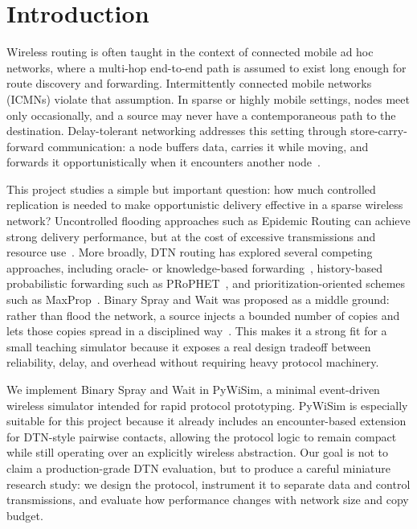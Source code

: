 \section{Introduction}

Wireless routing is often taught in the context of connected mobile ad hoc networks, where a multi-hop end-to-end path is assumed to exist long enough for route discovery and forwarding. Intermittently connected mobile networks (ICMNs) violate that assumption. In sparse or highly mobile settings, nodes meet only occasionally, and a source may never have a contemporaneous path to the destination. Delay-tolerant networking addresses this setting through store-carry-forward communication: a node buffers data, carries it while moving, and forwards it opportunistically when it encounters another node~\cite{fall2003dtn}.

This project studies a simple but important question: how much controlled replication is needed to make opportunistic delivery effective in a sparse wireless network? Uncontrolled flooding approaches such as Epidemic Routing can achieve strong delivery performance, but at the cost of excessive transmissions and resource use~\cite{vahdat2000epidemic}. More broadly, DTN routing has explored several competing approaches, including oracle- or knowledge-based forwarding~\cite{jain2004routing}, history-based probabilistic forwarding such as PRoPHET~\cite{lindgren2012prophet}, and prioritization-oriented schemes such as MaxProp~\cite{burgess2006maxprop}. Binary Spray and Wait was proposed as a middle ground: rather than flood the network, a source injects a bounded number of copies and lets those copies spread in a disciplined way~\cite{spyropoulos2005spraywait,spyropoulos2008multiplecopy}. This makes it a strong fit for a small teaching simulator because it exposes a real design tradeoff between reliability, delay, and overhead without requiring heavy protocol machinery.

We implement Binary Spray and Wait in PyWiSim, a minimal event-driven wireless simulator intended for rapid protocol prototyping. PyWiSim is especially suitable for this project because it already includes an encounter-based extension for DTN-style pairwise contacts, allowing the protocol logic to remain compact while still operating over an explicitly wireless abstraction. Our goal is not to claim a production-grade DTN evaluation, but to produce a careful miniature research study: we design the protocol, instrument it to separate data and control transmissions, and evaluate how performance changes with network size and copy budget.

